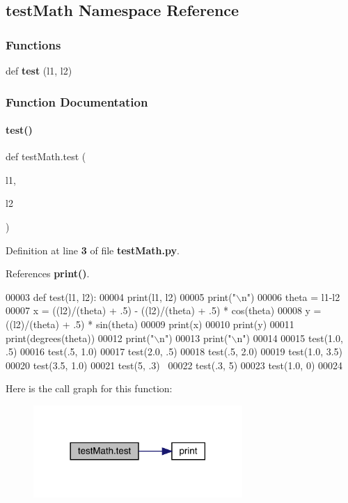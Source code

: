 \subsection{test\+Math Namespace Reference}
\label{namespacetest_math}
\subsubsection*{Functions}
\begin{DoxyCompactItemize}
\item 
def \textbf{ test} (l1, l2)
\end{DoxyCompactItemize}


\subsubsection{Function Documentation}
\mbox{\label{namespacetest_math_accae4d78fc0739220d35c06c2c0d5822}} 
\paragraph{test()}
{\footnotesize\ttfamily def test\+Math.\+test (\begin{DoxyParamCaption}\item[{}]{l1,  }\item[{}]{l2 }\end{DoxyParamCaption})}



Definition at line \textbf{ 3} of file \textbf{ test\+Math.\+py}.



References \textbf{ print()}.


\begin{DoxyCode}
00003 \textcolor{keyword}{def }test(l1, l2):
00004     print(l1, l2)
00005     print(\textcolor{stringliteral}{"\(\backslash\)n"})
00006     theta = l1-l2
00007     x = ((l2)/(theta) + .5) - ((l2)/(theta) + .5) * cos(theta)
00008     y = ((l2)/(theta) + .5) * sin(theta)
00009     print(x)
00010     print(y)
00011     print(degrees(theta))
00012     print(\textcolor{stringliteral}{"\(\backslash\)n"})
00013     print(\textcolor{stringliteral}{"\(\backslash\)n"})
00014 
00015 test(1.0, .5)
00016 test(.5, 1.0)
00017 test(2.0, .5)
00018 test(.5, 2.0)
00019 test(1.0, 3.5)
00020 test(3.5, 1.0)
00021 test(5, .3) 
00022 test(.3, 5)
00023 test(1.0, 0)
00024 \end{DoxyCode}
Here is the call graph for this function\+:
\nopagebreak
\begin{figure}[H]
\begin{center}
\leavevmode
\includegraphics[width=225pt]{namespacetest_math_accae4d78fc0739220d35c06c2c0d5822_cgraph}
\end{center}
\end{figure}
